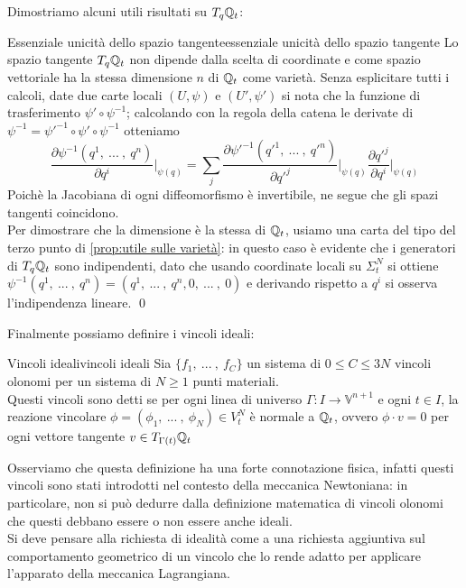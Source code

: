 \documentclass[openany]{book}
\renewcommand\V{\mathbb{V}}
\begin{document}
Dimostriamo alcuni utili risultati su $T_q\mathbb{Q}_t$:

\begin{proposition}{Essenziale unicità dello spazio tangente}{essenziale unicità dello spazio tangente}
    Lo spazio tangente $T_q\mathbb{Q}_t$ non dipende dalla scelta di coordinate e come spazio vettoriale ha la stessa dimensione $n$ di $\mathbb{Q}_t$ come varietà.
    \proof 
    Senza esplicitare tutti i calcoli, date due carte locali $(U,\psi)$ e $(U',\psi')$ si nota che la funzione di trasferimento $\psi'\circ\psi^{-1}$; calcolando con la regola della catena le derivate di $\psi^{-1} = \psi'^{-1}\circ \psi'\circ \psi^{-1}$ otteniamo 
    \[ \frac{\partial \psi^{-1}(q^1,\ ...\ ,\  q^n)}{\partial q^i}\bigg|_{\psi(q)} = \sum_j \frac{\partial \psi'^{-1}(q'^1,\ ...\ ,\  q'^n)}{\partial q'^j}\bigg|_{\psi(q)}\frac{\partial q'^j}{\partial q^i}\bigg|_{\psi(q)} \]
    Poichè la Jacobiana di ogni diffeomorfismo è invertibile, ne segue che gli spazi tangenti coincidono.\\
    Per dimostrare che la dimensione è la stessa di $\mathbb{Q}_t$, usiamo una carta del tipo del terzo punto di \cref{prop:utile sulle varietà}: in questo caso è evidente che i generatori di $T_q\mathbb{Q}_t$ sono indipendenti, dato che usando coordinate locali su $\Sigma_t^N$ si ottiene $\psi^{-1}(q^1,\ ...\ ,\ q^n) = (q^1,\ ...\ ,\ q^n,0,\ ...\ ,\ 0)$ e derivando rispetto a $q^i$ si osserva l'indipendenza lineare.
    \qed 
\end{proposition}

Finalmente possiamo definire i vincoli ideali:

\begin{definition}{Vincoli ideali}{vincoli ideali}
    Sia $\{f_1,\ ...\ ,\  f_C\}$ un sistema di $0\le C\le 3N$ vincoli olonomi per un sistema di $N\ge 1$ punti materiali.\\
    Questi vincoli sono detti  se per ogni linea di universo $\Gamma:I\to\V^{n+1}$ e ogni $t\in I$, la reazione vincolare $\phi = (\phi_1,\ ...\ ,\ \phi_N) \in V_t^N$ è normale a $\mathbb{Q}_t$, ovvero $\phi \cdot v = 0$ per ogni vettore tangente $v \in T_{\Gamma(t)}\mathbb{Q}_t$
\end{definition}

Osserviamo che questa definizione ha una forte connotazione fisica, infatti questi vincoli sono stati introdotti nel contesto della meccanica Newtoniana: in particolare, non si può dedurre dalla definizione matematica di vincoli olonomi che questi debbano essere o non essere anche ideali.\\
Si deve pensare alla richiesta di idealità come a una richiesta aggiuntiva sul comportamento geometrico di un vincolo che lo rende adatto per applicare l'apparato della meccanica Lagrangiana.
\end{document}
